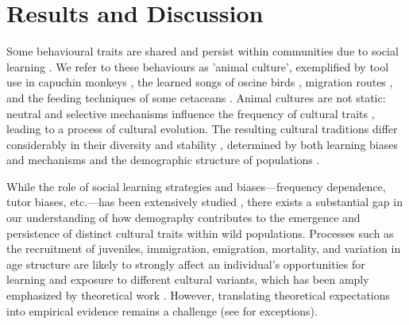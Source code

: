 \documentclass[9pt, onecolumn, twoside, lineno]{gsajnl}
\begin{document}
\section{Results and Discussion}

\lettrine[lines=2]Some behavioural traits are shared and persist within communities due to social learning \autocite{viciana2021}. We refer to these behaviours as 'animal culture', exemplified by tool use in capuchin monkeys \autocite{falotico2019}, the learned songs of oscine birds \autocite{aplin2017, riebel2015, williams2021}, migration routes \autocite{jesmer2018, berdahl2018, byholm2022}, and the feeding techniques of some cetaceans \autocite{allen2013, rendell2001}. Animal cultures are not static: neutral and selective mechanisms influence the frequency of cultural traits \autocite{potvin2015, williams2021}, leading to a process of cultural evolution. The resulting cultural traditions differ considerably in their diversity and stability \autocite{tchernichovski2017}, determined by both learning biases and mechanisms and the demographic structure of populations \autocite{deffner2022a, kandler2017}. 

While the role of social learning strategies and biases---frequency dependence, tutor biases, etc.---has been extensively studied \autocite{pike2010, kendal2015, aplin2017, lachlan2018, tchernichovski2021}, there exists a substantial gap in our understanding of how demography contributes to the emergence and persistence of distinct cultural traits within wild populations. Processes such as the recruitment of juveniles, immigration, emigration, mortality, and variation in age structure are likely to strongly affect an individual's opportunities for learning and exposure to different cultural variants, which has been amply emphasized by theoretical work \autocite{deffner2022a, deffner2022, kandler2023, fogarty2019, deffner2020, derex2016, kirby2021, nunn2009, barta2023, dyble2024, chimento2024}. However, translating theoretical expectations into empirical evidence remains a challenge (see \autocite{chimento2021, fayet2014, payne1993} for exceptions).
\end{document}
